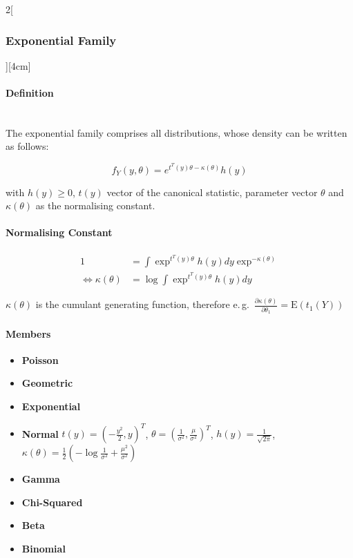 \documentclass[8pt]{extarticle}
\begin{document}
\begin{multicols}{2}[\subsubsection{Exponential Family}][4cm]

  \paragraph{Definition} \ \\
  \noindent The exponential family comprises all distributions, whose density can be written as follows:
  
  $$f_Y(y,\theta) = e^{t^T(y)\theta - \kappa (\theta)}h(y)$$
  
  \noindent with $h(y) \geq 0$, $t(y)$ vector of the canonical statistic, parameter vector $\theta$ and $\kappa (\theta)$ as the normalising constant.
  
  \paragraph{Normalising Constant}
  
  \begin{align*}
  1 &= \int \exp^{t^T(y)\theta}h(y)dy \exp^{ - \kappa (\theta)} \\
  \Leftrightarrow \kappa (\theta) &= \log \int \exp^{t^T(y)\theta}h(y)dy
  \end{align*}
  
  \noindent $\kappa (\theta)$ is the cumulant generating function, therefore e.\,g.\ $\frac{\partial\kappa(\theta)}{\partial\theta_1} = \mathrm{E}(t_1(Y))$ 
  
  
  
  \paragraph{Members}
  
  \begin{itemize}
  \item \textbf{Poisson}
  \item \textbf{Geometric}
  \item \textbf{Exponential}
  \item \textbf{Normal}
   $t(y) = \left(-\frac{y^2}{2},y \right)^T$,  
   $\theta = \left(\frac{1}{\sigma^2}, \frac{\mu}{\sigma^2}\right)^T$,
   $h(y) = \frac{1}{\sqrt{2\pi}}$,
   $\kappa ( \theta ) = \frac{1}{2} \left( -\log \frac{1}{\sigma^2} + \frac{\mu^2}{\sigma^2} \right)$
  \item \textbf{Gamma}
  \item \textbf{Chi-Squared}
  \item \textbf{Beta}
  \item \textbf{Binomial}
  \end{itemize}
  


\end{multicols}
\end{document}
